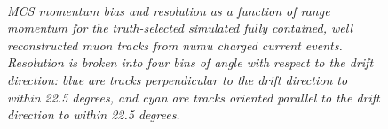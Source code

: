 \begin{figure}
\centering
\mbox{
	\quad
	}
\caption{\textit{MCS momentum bias and resolution as a function of range momentum for the truth-selected simulated fully contained, well reconstructed muon tracks from numu charged current events. Resolution is broken into four bins of angle with respect to the drift direction: blue are tracks perpendicular to the drift direction to within 22.5 degrees, and cyan are tracks oriented parallel to the drift direction to within 22.5 degrees.}}
\label{xangle_bias_resolution_fig}
\end{figure}


